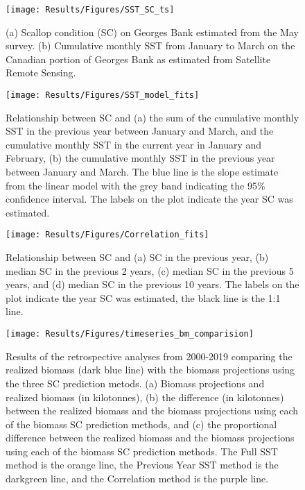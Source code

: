 \documentclass[
]{article}
\begin{document}
\clearpage
\begin{figure}[htb]

{\centering \texttt{[image: Results/Figures/SST\_SC\_ts]} 

}

\caption{(a) Scallop condition (SC) on Georges Bank estimated from the May survey. (b) Cumulative monthly SST from January to March on the Canadian portion of Georges Bank as estimated from Satellite Remote Sensing.}\label{fig:sc-sst-ts-plt}
\end{figure}

\clearpage
\begin{figure}[htb]

{\centering \texttt{[image: Results/Figures/SST\_model\_fits]} 

}

\caption{Relationship between SC and (a) the sum of the cumulative monthly SST in the previous year between January and March, and the cumulative monthly SST in the current year in January and February, (b) the cumulative monthly SST in the previous year between January and March. The blue line is the slope estimate from the linear model with the grey band indicating the 95\% confidence interval. The labels on the plot indicate the year SC was estimated.}\label{fig:sc-sst-mod-plt}
\end{figure}

\clearpage
\begin{figure}[htb]

{\centering \texttt{[image: Results/Figures/Correlation\_fits]} 

}

\caption{Relationship between SC and (a) SC in the previous year, (b) median SC in the previous 2 years, (c) median SC in the previous 5 years, and (d) median SC in the previous 10 years. The labels on the plot indicate the year SC was estimated, the black line is the 1:1 line.}\label{fig:sc-cor-mod-plt}
\end{figure}

\clearpage
\begin{figure}[htb]

{\centering \texttt{[image: Results/Figures/timeseries\_bm\_comparision]} 

}

\caption{Results of the retrospective analyses from 2000-2019 comparing the realized biomass (dark blue line) with the biomass projections using the three SC prediction metods. (a) Biomass projections and realized biomass (in kilotonnes), (b) the difference (in kilotonnes) between the realized biomass and the biomass projections using each of the biomass SC prediction methods, and (c) the proportional difference between the realized biomass and the biomass projections using each of the biomass SC prediction methods.  The Full SST method is the orange line, the Previous Year SST method is the darkgreen line, and the Correlation method is the purple line.}\label{fig:bm-ts-plt}
\end{figure}
\end{document}
